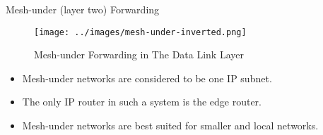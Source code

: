\documentclass[10pt]{beamer}
\begin{document}
\begin{frame}{Mesh-under (layer two) Forwarding}
    \begin{figure}[htpb]
        \centering
        \texttt{[image: ../images/mesh-under-inverted.png]}
        \caption{Mesh-under Forwarding in The Data Link Layer\cite{olsson20146lowpan}}
    \end{figure}

    \begin{itemize}
        \item Mesh-under networks are considered to be one IP subnet.\cite{olsson20146lowpan}
        \item The only IP router in such a system is the edge router.\cite{olsson20146lowpan}
        \item Mesh-under networks are best suited for smaller and local networks.\cite{olsson20146lowpan}
    \end{itemize}
\end{frame}
\end{document}
